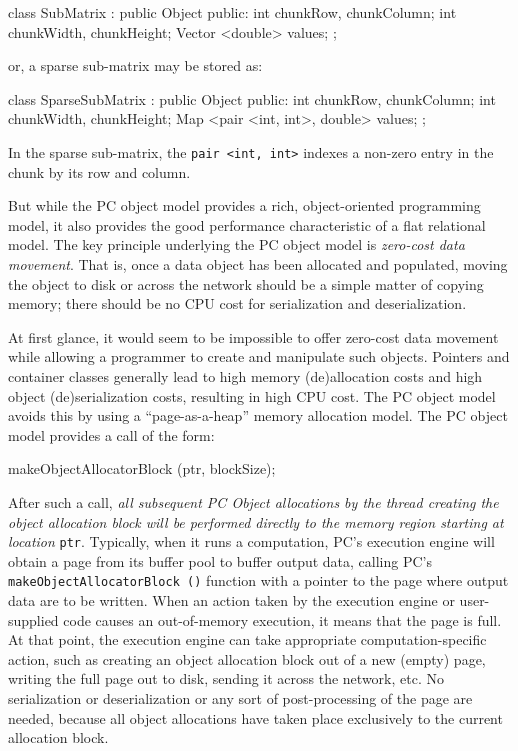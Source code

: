 \begin{code}
class SubMatrix : public Object {
public:
	int chunkRow, chunkColumn;
	int chunkWidth, chunkHeight;
	Vector <double> values; 
};
\end{code}

or, a sparse sub-matrix may be stored as:

\begin{code}
class SparseSubMatrix : public Object {
public:
	int chunkRow, chunkColumn;
	int chunkWidth, chunkHeight;
	Map <pair <int, int>, double> values; 
};
\end{code}

In the sparse sub-matrix, the \texttt{pair <int, int>} indexes a non-zero entry in the chunk by its row and column.

But while the PC object model provides a rich, object-oriented programming model, it also provides the good performance characteristic
of a flat relational model.
The key principle underlying the PC object model is \emph{zero-cost data movement}.  That is, once a data object
has been allocated and populated, moving the object to disk or across the network should be a simple matter of copying memory; there
should be no CPU cost for serialization and deserialization.

At first glance, it would seem to be impossible to offer zero-cost data movement while allowing a programmer to create and manipulate such objects.  
Pointers and container classes 
generally lead to high memory (de)allocation costs and high object (de)serialization costs, resulting in high CPU cost.
The PC object model avoids this 
by using a ``page-as-a-heap'' memory allocation model.  
The PC object model provides a call of the form:

\begin{code}
makeObjectAllocatorBlock (ptr, blockSize);
\end{code}

After such a call, \emph{all subsequent PC Object allocations by the thread creating the object allocation block will be performed directly to the memory
region starting at location} \texttt{ptr}.
Typically, when it runs a computation, PC's execution engine will obtain a page from its buffer pool to buffer output data, calling
PC's
\texttt{makeObjectAllocatorBlock ()} function with a pointer to the page where output data are to be written.  
When an action taken by the execution engine or user-supplied code causes an
out-of-memory execution, it means that the page is full.  At that point, the execution engine can take appropriate computation-specific 
action, such as creating 
an object allocation block out of a new (empty) page, writing the full page out to disk, sending it across the network, etc.  
No serialization or deserialization or any sort of post-processing of the page are needed, 
because all object allocations have taken place exclusively to the current allocation block.  

